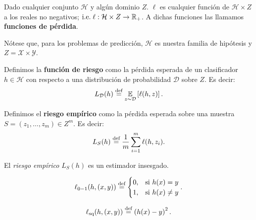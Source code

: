 \documentclass[8pt,a4paper]{extarticle}
\begin{document}
\begin{multicols}{3}
\begin{boxdef}
	Dado cualquier conjunto $\mathcal{H}$ y algún dominio $Z$. $ \ell$ es cualquier función de $\mathcal{H} \times Z$ a los reales no negativos; $\text{\normalfont i.e.}\; \ell: \mathcal{H} \times Z \to \mathbb{R}_{+}$. A dichas funciones las llamamos \textbf{funciones de pérdida}. \par
	Nótese que, para los problemas de predicción, $\mathcal{H}$ es nuestra familia de hipótesis y $Z = \mathcal{X} \times \mathcal{Y}$.
\end{boxdef}

\begin{boxdef}
	Definimos la \textbf{función de riesgo} como la pérdida esperada de un clasificador $h \in \mathcal{H}$ con respecto a una distribución de probabilidad $\mathcal{D}$ sobre $Z$. Es decir:
\[
	L_{\mathcal{D}} (h) \stackrel{\text{\normalfont def}}{=} \underset{z\sim \mathcal{D}}{\mathbb{E}} \left[ \ell (h,z) \right]
.\]
\end{boxdef}

\begin{boxdef}
	Definimos el \textbf{riesgo empírico} como la pérdida esperada sobre una muestra $S = \left( z_1, \ldots, z_m \right) \in Z^m$. Es decir:
	\[
		L_S (h) \stackrel{\text{\normalfont def}}{=} \frac{1}{m} \sum_{i = 1}^{m} \ell (h, z_i)
	.\] 
\end{boxdef}

\begin{boxprop}[]
	El \emph{riesgo empírico} $L_S (h)$ es un estimador insesgado.
\end{boxprop}

\begin{boxdef}[Pérdida 0-1]
	\[
		\ell_{0-1} (h, (x,y)) \stackrel{\text{\normalfont def}}{=} \begin{cases}
			0, & \text{\normalfont si } h(x) = y \\
			1, & \text{\normalfont si } h(x) \neq y
		\end{cases}
	.\] 
\end{boxdef}

\begin{boxdef}
	\[
		\ell_{\text{\normalfont sq}} (h, (x,y)) \stackrel{\text{\normalfont def}}{=} \left( h(x) - y \right)^2
	.\] 
\end{boxdef}


\end{multicols}
\end{document}
